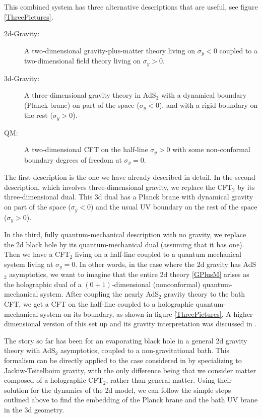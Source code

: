 \documentclass[12pt]{article}
\begin{document}
This combined system has three alternative descriptions that are useful, see figure \ref{ThreePictures}.  
\begin{description}
\item[2d-Gravity:]
A two-dimensional gravity-plus-matter theory living on $\sigma_y<0$ coupled to a two-dimensional field theory living on $\sigma_y>0$.

\item[3d-Gravity:] 
A three-dimensional gravity theory in AdS$_3$ with a dynamical boundary (Planck brane) on part of the space ($\sigma_y<0$), and with a rigid boundary on the rest ($\sigma_y>0$). 

\item[QM:]
A two-dimensional CFT on the half-line $\sigma_y>0$ with some non-conformal boundary degrees of freedom at $\sigma_y = 0$.
\end{description}

The first description is the one we have already described in detail.
In the second description, which involves three-dimensional gravity, we replace the CFT$_2$ by its three-dimensional dual. 
This 3d dual has a Planck brane with dynamical gravity on part of the space ($\sigma_y<0$) and the usual UV boundary on the rest of the space ($\sigma_y>0$). 

In the third, fully quantum-mechanical description with no gravity, we replace the 2d black hole by its quantum-mechanical dual (assuming that it has one). 
Then we have a CFT$_2$ living on a half-line coupled to a quantum mechanical system living at $\sigma_y=0$. 
In other words, in the case where the 2d gravity has AdS$_2$ asymptotics, we want to imagine that the entire 2d theory \eqref{GPlusM} arises as the holographic dual of a $(0+1)$-dimensional (nonconformal) quantum-mechanical system. 
After coupling the nearly AdS$_2$ gravity theory to the bath CFT, we get a CFT on the half-line coupled to a holographic quantum-mechanical system on its boundary, as shown in figure \ref{ThreePictures}. 
A higher dimensional version of this set up and its gravity interpretation was discussed in \cite{Karch:2000ct}.

The story so far has been for an evaporating black hole in a general 2d gravity theory with AdS$_2$ asymptotics, coupled to a non-gravitational bath. 
This formalism can be directly applied to the case considered in \cite{Almheiri:2019psf} by specializing to Jackiw-Teitelboim gravity, with the only difference being that we consider matter composed of a holographic CFT$_2$, rather than general matter.
Using their solution for the dynamics of the 2d model, we can follow the simple steps outlined above to find the embedding of the Planck brane and the bath UV brane in the 3d geometry.  
\end{document}
